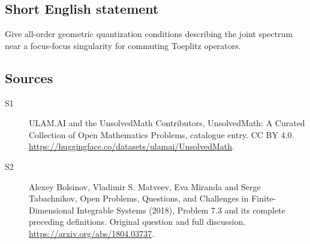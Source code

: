 \documentclass[11pt]{article}
\begin{document}
\subsection{Short English statement}
Give all-order geometric quantization conditions describing the joint spectrum near a focus-focus singularity for commuting Toeplitz operators.
\subsection{Sources}
\begin{description}
\item[\hypertarget{source:statement:1}{S1}] ULAM.AI and the UnsolvedMath Contributors, UnsolvedMath: A Curated Collection of Open Mathematics Problems, catalogue entry. CC BY 4.0. \url{https://huggingface.co/datasets/ulamai/UnsolvedMath}.
\item[\hypertarget{source:statement:2}{S2}] Alexey Bolsinov, Vladimir S. Matveev, Eva Miranda and Serge Tabachnikov, Open Problems, Questions, and Challenges in Finite-Dimensional Integrable Systems (2018), Problem 7.3 and its complete preceding definitions. Original question and full discussion. \url{https://arxiv.org/abs/1804.03737}.

\end{description}
\label{end:statement}
\end{document}
